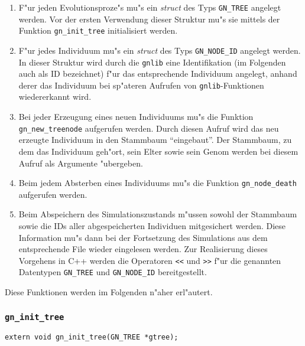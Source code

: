 \documentclass[a4paper, fleqn]{article}
\begin{document}
\begin{enumerate}

\item F"ur jeden Evolutionsproze"s mu"s ein \textsl{struct} des Typs
    \verb|GN_TREE| angelegt werden. Vor der ersten Verwendung dieser
    Struktur mu"s sie mittels der Funktion \verb|gn_init_tree|
    initialisiert werden.

\item F"ur jedes Individuum mu"s ein \textsl{struct} des Typs
    \verb|GN_NODE_ID| angelegt werden. In dieser Struktur wird
    durch die \texttt{gnlib} eine Identifikation (im Folgenden auch als
    ID bezeichnet) f"ur das entsprechende
    Individuum angelegt, anhand derer das Individuum bei sp"ateren
    Aufrufen von \texttt{gnlib}-Funktionen wiedererkannt wird.

\item Bei jeder Erzeugung eines neuen Individuums mu"s die Funktion
    \verb|gn_new_treenode| aufgerufen werden. Durch diesen Aufruf wird
    das neu erzeugte Individuum in den Stammbaum "`eingebaut"'. Der
    Stammbaum, zu dem das Individuum geh"ort, sein Elter sowie sein
    Genom werden bei diesem Aufruf als Argumente "ubergeben.

\item Beim jedem Absterben eines Individuums mu"s die Funktion
    \verb|gn_node_death| aufgerufen werden.

\item Beim Abspeichern des Simulationszustands m"ussen sowohl der
    Stammbaum sowie die IDs aller abgespeicherten Individuen mitgesichert
    werden. Diese Information mu"s dann bei der Fortsetzung des
    Simulations aus dem entsprechende File wieder eingelesen werden.
    Zur Realisierung dieses Vorgehens in C++ werden die Operatoren
    \verb|<<| und \verb|>>| f"ur die genannten Datentypen
    \verb|GN_TREE| und \verb|GN_NODE_ID| bereitgestellt.

\end{enumerate}

Diese Funktionen werden im Folgenden n"aher erl"autert.


\subsubsection{\texttt{gn\_init\_tree}}
\label{gn_init_tree}

\begin{verbatim}
extern void gn_init_tree(GN_TREE *gtree);
\end{verbatim}
\end{document}
